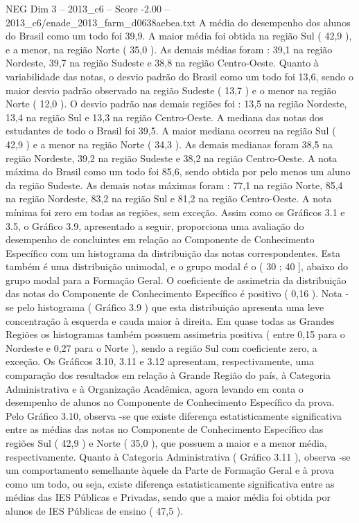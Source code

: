 \begin{textsample}{NEG Dim 3 – 2013\_c6 – Score -2.00 – 2013\_c6/enade\_2013\_farm\_d0638aebea.txt}
A média do desempenho dos alunos do Brasil como um todo foi 39,9.
A maior média foi obtida na região Sul ( 42,9 ), e a menor, na região Norte ( 35,0 ).
As demais médias foram : 39,1 na região Nordeste, 39,7 na região Sudeste e 38,8 na região Centro-Oeste.
Quanto à variabilidade das notas, o desvio padrão do Brasil como um todo foi 13,6, sendo o maior desvio padrão observado na região Sudeste ( 13,7 ) e o menor na região Norte ( 12,0 ).
O desvio padrão nas demais regiões foi : 13,5 na região Nordeste, 13,4 na região Sul e 13,3 na região Centro-Oeste.
A mediana das notas dos estudantes de todo o Brasil foi 39,5.
A maior mediana ocorreu na região Sul ( 42,9 ) e a menor na região Norte ( 34,3 ).
As demais medianas foram 38,5 na região Nordeste, 39,2 na região Sudeste e 38,2 na região Centro-Oeste.
A nota máxima do Brasil como um todo foi 85,6, sendo obtida por pelo menos um aluno da região Sudeste.
As demais notas máximas foram : 77,1 na região Norte, 85,4 na região Nordeste, 83,2 na região Sul e 81,2 na região Centro-Oeste.
A nota mínima foi zero em todas as regiões, sem exceção.
Assim como os Gráficos 3.1 e 3.5, o Gráfico 3.9, apresentado a seguir, proporciona uma avaliação do desempenho de concluintes em relação ao Componente de Conhecimento Específico com um histograma da distribuição das notas correspondentes.
Esta também é uma distribuição unimodal, e o grupo modal é o ( 30 ; 40 ], abaixo do grupo modal para a Formação Geral.
O coeficiente de assimetria da distribuição das notas do Componente de Conhecimento Específico é positivo ( 0,16 ).
Nota -se pelo histograma ( Gráfico 3.9 ) que esta distribuição apresenta uma leve concentração à esquerda e cauda maior à direita.
Em quase todas as Grandes Regiões os histogramas também possuem assimetria positiva ( entre 0,15 para o Nordeste e 0,27 para o Norte ), sendo a região Sul com coeficiente zero, a exceção.
Os Gráficos 3.10, 3.11 e 3.12 apresentam, respectivamente, uma comparação dos resultados em relação à Grande Região do país, à Categoria Administrativa e à Organização Acadêmica, agora levando em conta o desempenho de alunos no Componente de Conhecimento Específico da prova.
Pelo Gráfico 3.10, observa -se que existe diferença estatisticamente significativa entre as médias das notas no Componente de Conhecimento Específico das regiões Sul ( 42,9 ) e Norte ( 35,0 ), que possuem a maior e a menor média, respectivamente.
Quanto à Categoria Administrativa ( Gráfico 3.11 ), observa -se um comportamento semelhante àquele da Parte de Formação Geral e à prova como um todo, ou seja, existe diferença estatisticamente significativa entre as médias das IES Públicas e Privadas, sendo que a maior média foi obtida por alunos de IES Públicas de ensino ( 47,5 ).

\end{textsample}
